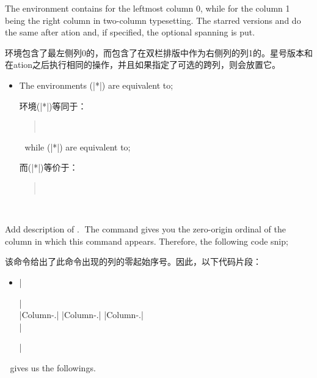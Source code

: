 \begin{description}


\item[\ENV{leftcolumn}{}]\mbox{}
\mbox{}
\mbox{}
\mbox{}\par\nobreak
The environment  contains  for the leftmost
column 0, while  for the column 1 being the right column
in two-column typesetting.  The starred versions  and
 do the same after \sync{}ation and, if specified, the
optional spanning  is put.

环境包含了最左侧列0的，而包含了在双栏排版中作为右侧列的列1的。星号版本和在\sync{}ation之后执行相同的操作，并且如果指定了可选的跨列，则会放置它。


\begin{itemize}
\item
The environments (|*|) are equivalent to;

环境(|*|)等同于：

\begin{quote}
\\
\end{quote}

while (|*|) are equivalent to;

而(|*|)等价于：

\begin{quote}
\\
\end{quote}

\end{itemize}



\item[\Midx{\!\thecolumn!}]\mbox{}\par
{}
{Add description of .}
The command gives you the zero-origin ordinal of the column in which this
command appears.  Therefore, the following code snip;

该命令给出了此命令出现的列的零起始序号。因此，以下代码片段：
\begin{itemize}\item[]
|\begin{paracol}{3}|\\
|Column-\thecolumn.\switchcolumn|
|Column-\thecolumn.\switchcolumn|
|Column-\thecolumn.|\\
|\end{paracol}|
\end{itemize}

gives us the followings.


\end{description}
